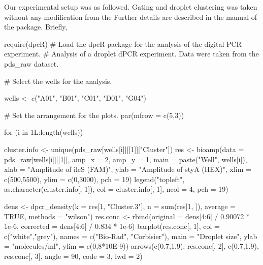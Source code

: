 Our experimental setup was as followed. Gating and droplet clustering was taken 
without any modification from the Further details are described in the manual 
of the  package. Briefly, 

\begin{example}
require(dpcR)
# Load the dpcR package for the analysis of the digital PCR experiment.
# Analysis of a droplet dPCR experiment. Data were taken from the pds_raw dataset.

# Select the wells for the analysis.

wells <- c("A01", "B01", "C01", "D01", "G04")

# Set the arrangement for the plots.
par(mfrow = c(5,3))

for (i in 1L:length(wells)) {
  cluster.info <- unique(pds_raw[wells[i]][[1]]["Cluster"])
  res <- bioamp(data = pds_raw[wells[i]][[1]], amp_x = 2, amp_y = 1, 
		main = paste("Well", wells[i]), xlab = "Amplitude of ileS (FAM)",
		ylab = "Amplitude of styA (HEX)", xlim = c(500,5500), 
		ylim = c(0,3000), pch = 19)
  legend("topleft", as.character(cluster.info[, 1]), col = cluster.info[, 1], 
	 ncol = 4, pch = 19)
  
  dens <- dpcr_density(k = res[1, "Cluster.3"], n = sum(res[1, ]), 
			average = TRUE, methods = "wilson")  
  res.conc <- rbind(original = dens[4:6] /  0.90072 * 1e-6, 
		    corrected = dens[4:6] / 0.834 * 1e-6)
  barplot(res.conc[, 1], col = c("white","grey"), 
	  names = c("Bio-Rad", "Corbisier"), 
	  main = "Droplet size", ylab = "molecules/ml", ylim = c(0,8*10E-9))
    arrows(c(0.7,1.9), res.conc[, 2], c(0.7,1.9), res.conc[, 3], angle = 90, 
	   code = 3, lwd = 2)
}
\end{example}

